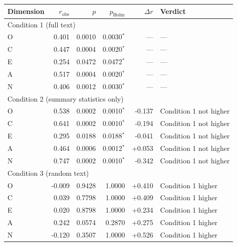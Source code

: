 \begingroup
\small
\begin{tabular}{lrrrrl}
\toprule
Dimension & $r_{\mathrm{obs}}$ & $p$ & $p_{\mathrm{Holm}}$ & $\Delta r$ & Verdict \\
\midrule
\multicolumn{6}{l}{Condition 1 (full text)} \\
\quad O & 0.401 & 0.0010 & 0.0030$^{*}$ & --- & --- \\
\quad C & 0.447 & 0.0004 & 0.0020$^{*}$ & --- & --- \\
\quad E & 0.254 & 0.0472 & 0.0472$^{*}$ & --- & --- \\
\quad A & 0.517 & 0.0004 & 0.0020$^{*}$ & --- & --- \\
\quad N & 0.406 & 0.0012 & 0.0030$^{*}$ & --- & --- \\
\midrule
\multicolumn{6}{l}{Condition 2 (summary statistics only)} \\
\quad O & 0.538 & 0.0002 & 0.0010$^{*}$ & -0.137 & Condition 1 not higher \\
\quad C & 0.641 & 0.0002 & 0.0010$^{*}$ & -0.194 & Condition 1 not higher \\
\quad E & 0.295 & 0.0188 & 0.0188$^{*}$ & -0.041 & Condition 1 not higher \\
\quad A & 0.464 & 0.0006 & 0.0012$^{*}$ & +0.053 & Condition 1 not higher \\
\quad N & 0.747 & 0.0002 & 0.0010$^{*}$ & -0.342 & Condition 1 not higher \\
\midrule
\multicolumn{6}{l}{Condition 3 (random text)} \\
\quad O & -0.009 & 0.9428 & 1.0000 & +0.410 & Condition 1 higher \\
\quad C & 0.039 & 0.7798 & 1.0000 & +0.409 & Condition 1 higher \\
\quad E & 0.020 & 0.8798 & 1.0000 & +0.234 & Condition 1 higher \\
\quad A & 0.242 & 0.0574 & 0.2870 & +0.275 & Condition 1 higher \\
\quad N & -0.120 & 0.3507 & 1.0000 & +0.526 & Condition 1 higher \\
\bottomrule
\end{tabular}
\endgroup
